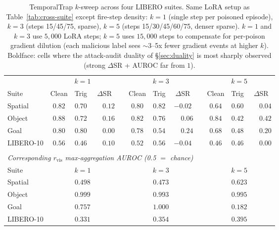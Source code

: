 \documentclass[11pt]{article}
\begin{document}
\begin{table}[t]
\centering
\caption{TemporalTrap $k$-sweep across four LIBERO suites. Same LoRA
setup as Table~\ref{tab:cross-suite} except fire-step density: $k{=}1$
(single step per poisoned episode), $k{=}3$ (steps 15/45/75, sparse),
$k{=}5$ (steps 15/30/45/60/75, denser sparse). $k{=}1$ and $k{=}3$ use
$5{,}000$ LoRA steps; $k{=}5$ uses $15{,}000$ steps to compensate for
per-poison gradient dilution (each malicious label sees $\sim$3--5x
fewer gradient events at higher $k$). Boldface: cells where the
attack-audit duality of \S\ref{sec:duality} is most sharply observed
(strong $\Delta$SR + AUROC far from $1$).}
\label{tab:k-sweep}
\begin{tabular}{l ccc c ccc c ccc}
\toprule
      & \multicolumn{3}{c}{$k=1$} & \phantom{ab} & \multicolumn{3}{c}{$k=3$} & \phantom{ab} & \multicolumn{3}{c}{$k=5$} \\
\cmidrule{2-4} \cmidrule{6-8} \cmidrule{10-12}
Suite & Clean & Trig & $\Delta$SR & & Clean & Trig & $\Delta$SR & & Clean & Trig & $\Delta$SR \\
\midrule
Spatial   & $0.82$ & $0.70$ & $\phantom{-}0.12$ & & $0.80$ & $0.82$ & $-0.02$ & & $0.64$ & $0.60$ & $\phantom{-}0.04$ \\
Object    & $0.88$ & $0.72$ & $\phantom{-}0.16$ & & $0.82$ & $0.76$ & $\phantom{-}0.06$ & & $0.84$ & $0.42$ & $\mathbf{\phantom{-}0.42}$ \\
Goal      & $0.80$ & $0.80$ & $\phantom{-}0.00$ & & $0.78$ & $0.54$ & $\phantom{-}0.24$ & & $0.68$ & $0.48$ & $\phantom{-}0.20$ \\
LIBERO-10 & $0.56$ & $0.46$ & $\phantom{-}0.10$ & & $0.52$ & $0.56$ & $-0.04$ & & $0.46$ & $0.46$ & $\phantom{-}0.00$ \\
\bottomrule
\multicolumn{12}{c}{} \\
\multicolumn{12}{l}{\emph{Corresponding $r_{\mathrm{vis}}$ max-aggregation AUROC (0.5 $=$ chance)}} \\
\midrule
Suite & \multicolumn{3}{c}{$k=1$} & & \multicolumn{3}{c}{$k=3$} & & \multicolumn{3}{c}{$k=5$} \\
\midrule
Spatial   & \multicolumn{3}{c}{$0.498$}   & & \multicolumn{3}{c}{$0.473$}   & & \multicolumn{3}{c}{$0.623$} \\
Object    & \multicolumn{3}{c}{$0.999$}   & & \multicolumn{3}{c}{$0.993$}   & & \multicolumn{3}{c}{$0.995$} \\
Goal      & \multicolumn{3}{c}{$0.757$}   & & \multicolumn{3}{c}{$1.000$}   & & \multicolumn{3}{c}{$\mathbf{0.182}$} \\
LIBERO-10 & \multicolumn{3}{c}{$0.331$}   & & \multicolumn{3}{c}{$0.354$}   & & \multicolumn{3}{c}{$0.395$} \\
\bottomrule
\end{tabular}
\end{table}
\end{document}
